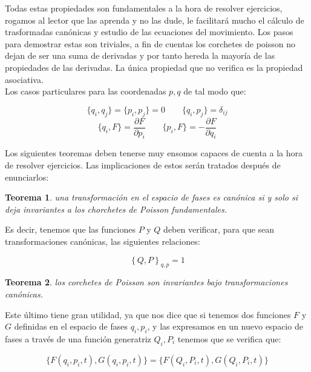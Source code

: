 \documentclass[12pt,a4paper]{article}
\numberwithin{equation}{section}
\numberwithin{figure}{section}
\newcommand{\parciales}[2]{\frac{\partial #1}{\partial #2}}
\newtheorem{theorem}{Teorema}[section]
\begin{document}
Todas estas propiedades son fundamentales a la hora de resolver ejercicios, rogamos al lector que las aprenda y no las dude, le facilitará mucho el cálculo de trasformadas canónicas y estudio de las ecuaciones del movimiento. Los pasos para demostrar estas son triviales, a fin de cuentas los corchetes de poisson no dejan de ser una suma de derivadas y por tanto hereda la mayoría de las propiedades de las derivadas. La única propiedad que no verifica es la propiedad asociativa. \\

Los casos particulares para las coordenadas $p,q$ de tal modo que:

\begin{equation}
\{ q_i, q_ j \} = \{ p_i , p_j \} = 0 \quad \quad \{q_i,p_j\} = \delta_{ij}
\end{equation}
\begin{equation}
\{ q_i, F \} = \parciales{F}{p_i} \quad \quad \{ p_i, F \} = - \parciales{F}{q_i}
\end{equation}

Los siguientes teoremas deben tenerse muy ensomos capaces de  cuenta a la hora de resolver ejercicios. Las implicaciones de estos serán tratados después de enunciarlos:

\begin{theorem}
una transformación en el espacio de fases es canónica si y solo si deja invariantes a los chorchetes de Poisson fundamentales.
\end{theorem}

Es decir, tenemos que las funciones $P$ y $Q$ deben verificar, para que sean transformaciones canónicas, las siguientes relaciones:

\begin{equation}
\left\lbrace Q , P \right\rbrace_{q,p} = 1 
\end{equation}

\begin{theorem}
los corchetes de Poisson son invariantes bajo transformaciones canónicas.
\end{theorem}

Este último tiene gran utilidad, ya que nos dice que si tenemos dos funciones $F$ y $G$ definidas en el espacio de fases $q_i,p_i$, y las expresamos en un nuevo espacio de fases a través de una función generatriz $Q_i, P_i$ tenemos que se verifica que:


\begin{equation}
\{ F(q_i,p_i,t), G(q_i,p_i,t) \} = \{ F(Q_i,P_i,t), G(Q_i,P_i,t) \}  
\end{equation}
\end{document}
